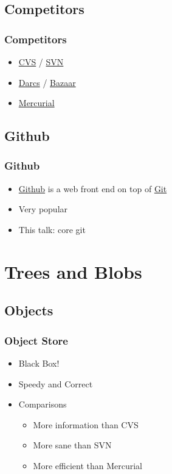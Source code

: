 \subsection{Competitors}

\begin{frame}
  \frametitle{Competitors}
  \begin{itemize}
  \item \href{https://www.nongnu.org/cvs/}{CVS} / \href{https://subversion.apache.org/}{SVN}
  \pause
  \item \href{http://darcs.net/}{Darcs} / \href{https://en.wikipedia.org/wiki/GNU_Bazaar}{Bazaar}
  \pause
  \item \href{https://www.mercurial-scm.org/}{Mercurial}
  \end{itemize}
\end{frame}

\subsection{Github}

\begin{frame}
  \frametitle{Github}
  \begin{itemize}
  \item \href{https://github.com/}{Github} is a web front end on top of \href{https://git-scm.com/}{Git}
  \pause
  \item Very popular
  \pause
  \item This talk: core git
  \end{itemize}
\end{frame}

\section{Trees and Blobs}

\subsection{Objects}

\begin{frame}
  \frametitle{Object Store}
  \begin{itemize}
  \item Black Box!
  \pause
  \item Speedy and Correct
  \pause
  \item Comparisons
    \begin{itemize}
    \item More information than CVS
    \item More sane than SVN
    \item More efficient than Mercurial
    \end{itemize}
  \end{itemize}
\end{frame}

